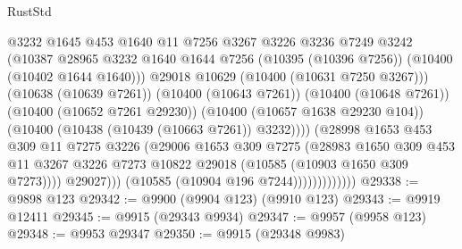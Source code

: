\begin{lexlean}{RustStd}
\begin{coremodule}
{\begin{coremodule}
{{{{{{{{{{{{{{{{{{{{{{{{{                                    @3232
                                    @1645
                                    @453
                                    @1640
                                    @11
                                    @7256
                                    @3267
                                    @3226
                                    @3236
                                    @7249
                                    @3242
                                    (@10387
                                      @28965
                                      @3232
                                      @1640
                                      @1644
                                      @7256
                                      (@10395 (@10396 @7256))
                                      (@10400 (@10402 @1644 @1640)))
                                    @29018
                                    @10629
                                    (@10400 (@10631 @7250 @3267)))
                                  (@10638 (@10639 @7261))
                                  (@10400 (@10643 @7261))
                                  (@10400 (@10648 @7261))
                                  (@10400 (@10652 @7261 @29230))
                                  (@10400 (@10657 @1638 @29230 @104))
                                  (@10400 (@10438 (@10439 (@10663 @7261)) @3232))))
                              (@28998
                                @1653
                                @453
                                @309
                                @11
                                @7275
                                @3226
                                (@29006
                                  @1653
                                  @309
                                  @7275
                                  (@28983
                                    @1650
                                    @309
                                    @453
                                    @11
                                    @3267
                                    @3226
                                    @7273
                                    @10822
                                    @29018
                                    (@10585 (@10903 @1650 @309 @7273))))
                                @29027)))
                          (@10585 (@10904 @196 @7244)))))))))))))
@29338 := @9898 @123
@29342 := @9900 (@9904 @123) (@9910 @123)
@29343 := @9919 @12411
@29345 := @9915 (@29343 @9934)
@29347 := @9957 (@9958 @123)
@29348 := @9953 @29347
@29350 := @9915 (@29348 @9983)
}}}}}}}}}}}}}}}}}}}}}}}}}
\end{coremodule}}
\end{coremodule}
\end{lexlean}
